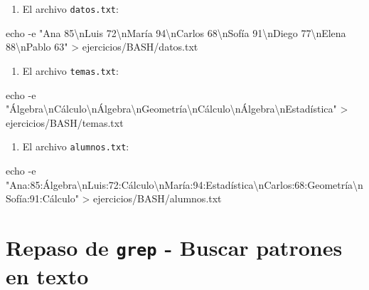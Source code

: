 \documentclass[
  spanish,
  12pt,
  letterpaper,
  DIV=11,
  numbers=noendperiod]{scrreprt}
\newenvironment{Shaded}{\begin{snugshade}}{\end{snugshade}}
\newcommand{\AttributeTok}[1]{\textcolor[rgb]{0.40,0.45,0.13}{#1}}
\newcommand{\BuiltInTok}[1]{\textcolor[rgb]{0.00,0.23,0.31}{#1}}
\newcommand{\NormalTok}[1]{\textcolor[rgb]{0.00,0.23,0.31}{#1}}
\newcommand{\OperatorTok}[1]{\textcolor[rgb]{0.37,0.37,0.37}{#1}}
\newcommand{\StringTok}[1]{\textcolor[rgb]{0.13,0.47,0.30}{#1}}
\providecommand{\tightlist}{%
  \setlength{\itemsep}{0pt}\setlength{\parskip}{0pt}}
\begin{document}
\begin{enumerate}
\def\labelenumi{\arabic{enumi}.}
\setcounter{enumi}{2}
\tightlist
\item
  El archivo \texttt{datos.txt}:
\end{enumerate}

\begin{Shaded}
\begin{Highlighting}[]
\BuiltInTok{echo} \AttributeTok{{-}e} \StringTok{"Ana 85\textbackslash{}nLuis 72\textbackslash{}nMaría 94\textbackslash{}nCarlos 68\textbackslash{}nSofía 91\textbackslash{}nDiego 77\textbackslash{}nElena 88\textbackslash{}nPablo 63"} \OperatorTok{\textgreater{}}\NormalTok{ ejercicios/BASH/datos.txt}
\end{Highlighting}
\end{Shaded}

\begin{enumerate}
\def\labelenumi{\arabic{enumi}.}
\setcounter{enumi}{3}
\tightlist
\item
  El archivo \texttt{temas.txt}:
\end{enumerate}

\begin{Shaded}
\begin{Highlighting}[]
\BuiltInTok{echo} \AttributeTok{{-}e} \StringTok{"Álgebra\textbackslash{}nCálculo\textbackslash{}nÁlgebra\textbackslash{}nGeometría\textbackslash{}nCálculo\textbackslash{}nÁlgebra\textbackslash{}nEstadística"} \OperatorTok{\textgreater{}}\NormalTok{ ejercicios/BASH/temas.txt}
\end{Highlighting}
\end{Shaded}

\begin{enumerate}
\def\labelenumi{\arabic{enumi}.}
\setcounter{enumi}{4}
\tightlist
\item
  El archivo \texttt{alumnos.txt}:
\end{enumerate}

\begin{Shaded}
\begin{Highlighting}[]
\BuiltInTok{echo} \AttributeTok{{-}e} \StringTok{"Ana:85:Álgebra\textbackslash{}nLuis:72:Cálculo\textbackslash{}nMaría:94:Estadística\textbackslash{}nCarlos:68:Geometría\textbackslash{}nSofía:91:Cálculo"} \OperatorTok{\textgreater{}}\NormalTok{ ejercicios/BASH/alumnos.txt}
\end{Highlighting}
\end{Shaded}

\section{\texorpdfstring{Repaso de \texttt{grep} - Buscar patrones en
texto}{Repaso de grep - Buscar patrones en texto}}\label{repaso-de-grep---buscar-patrones-en-texto}
\end{document}
